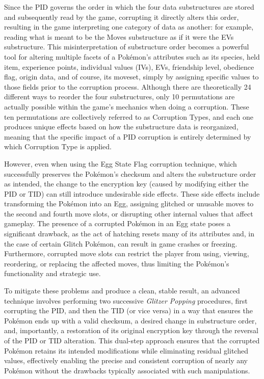 \documentclass[a4paper]{usiinfbachelorproject}
\begin{document}
Since the PID governs the order in which the four data substructures are stored and subsequently read by the game, corrupting it directly alters this order, resulting in the game interpreting one category of data as another: for example, reading what is meant to be the Moves substructure as if it were the EVs substructure. This misinterpretation of substructure order becomes a powerful tool for altering multiple facets of a Pokémon's attributes such as its species, held item, experience points, individual values (IVs), EVs, friendship level, obedience flag, origin data, and of course, its moveset, simply by assigning specific values to those fields prior to the corruption process. Although there are theoretically 24 different ways to reorder the four substructures, only 10 permutations are actually possible within the game’s mechanics when doing a corruption. These ten permutations are collectively referred to as Corruption Types, and each one produces unique effects based on how the substructure data is reorganized, meaning that the specific impact of a PID corruption is entirely determined by which Corruption Type is applied.

However, even when using the Egg State Flag corruption technique, which successfully preserves the Pokémon’s checksum and alters the substructure order as intended, the change to the encryption key (caused by modifying either the PID or TID) can still introduce undesirable side effects. These side effects include transforming the Pokémon into an Egg, assigning glitched or unusable moves to the second and fourth move slots, or disrupting other internal values that affect gameplay. The presence of a corrupted Pokémon in an Egg state poses a significant drawback, as the act of hatching resets many of its attributes and, in the case of certain Glitch Pokémon, can result in game crashes or freezing. Furthermore, corrupted move slots can restrict the player from using, viewing, reordering, or replacing the affected moves, thus limiting the Pokémon's functionality and strategic use.

To mitigate these problems and produce a clean, stable result, an advanced technique involves performing two successive \textit{Glitzer Popping} procedures, first corrupting the PID, and then the TID (or vice versa) in a way that ensures the Pokémon ends up with a valid checksum, a desired change in substructure order, and, importantly, a restoration of its original encryption key through the reversal of the PID or TID alteration. This dual-step approach ensures that the corrupted Pokémon retains its intended modifications while eliminating residual glitched values, effectively enabling the precise and consistent corruption of nearly any Pokémon without the drawbacks typically associated with such manipulations.
\end{document}
